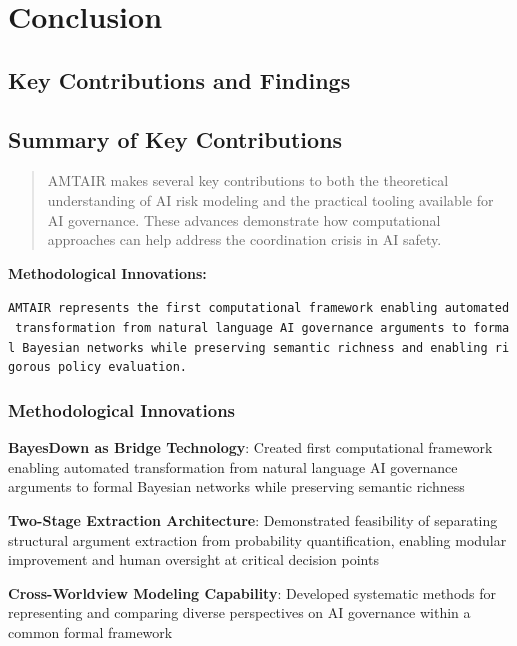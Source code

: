 \documentclass[
  11pt,
  letterpaper,
]{book}
\begin{document}

\chapter{Conclusion}\label{sec-conclusion}

\section{Key Contributions and Findings}\label{sec-key-contributions}

\section{Summary of Key Contributions}\label{sec-key-contributions2}

\begin{quote}
AMTAIR makes several key contributions to both the theoretical
understanding of AI risk modeling and the practical tooling available
for AI governance. These advances demonstrate how computational
approaches can help address the coordination crisis in AI safety.
\end{quote}

\textbf{Methodological Innovations:}

\texttt{AMTAIR\ represents\ the\ first\ computational\ framework\ enabling\ automated\ transformation\ from\ natural\ language\ AI\ governance\ arguments\ to\ formal\ Bayesian\ networks\ while\ preserving\ semantic\ richness\ and\ enabling\ rigorous\ policy\ evaluation.}

\subsection{Methodological
Innovations}\label{sec-methodological-innovations}

\textbf{BayesDown as Bridge Technology}: Created first computational
framework enabling automated transformation from natural language AI
governance arguments to formal Bayesian networks while preserving
semantic richness

\textbf{Two-Stage Extraction Architecture}: Demonstrated feasibility of
separating structural argument extraction from probability
quantification, enabling modular improvement and human oversight at
critical decision points

\textbf{Cross-Worldview Modeling Capability}: Developed systematic
methods for representing and comparing diverse perspectives on AI
governance within a common formal framework
\end{document}
